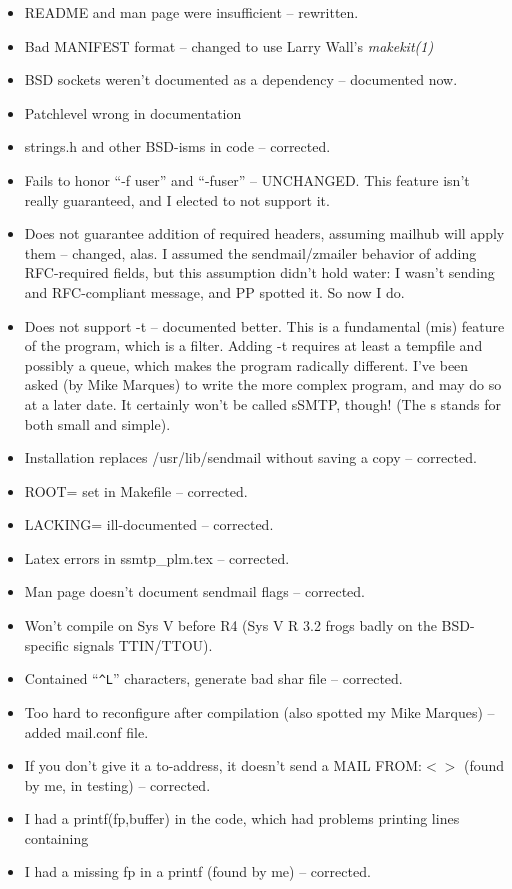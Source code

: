 \begin{itemize}
\item README and man page were insufficient -- rewritten.
\item Bad MANIFEST format -- changed to use Larry Wall's {\it makekit(1)}
\item BSD sockets weren't documented as a dependency -- documented now.
\item Patchlevel wrong in documentation
\item strings.h and other BSD-isms in code -- corrected.
\item Fails to honor ``-f user'' and ``-fuser'' -- UNCHANGED.  
	This feature isn't really guaranteed, and I elected to not
	support it.
\item Does not guarantee addition of required headers, assuming
	mailhub will apply them -- changed, alas.  I assumed the
	sendmail/zmailer behavior of adding RFC-required fields,
	but this assumption didn't hold water: I wasn't sending
	and RFC-compliant message, and PP spotted it.  So now
	I do.
\item Does not support -t -- documented better.  This is a
	fundamental (mis) feature of the program, which is a filter.
	Adding -t requires at least a tempfile and possibly a
	queue, which makes the program radically different.  I've
	been asked (by Mike Marques) to write the more complex program,
	and may do so at a later date.  It certainly won't be called
	sSMTP, though! (The s stands for both small and simple).
\item Installation replaces /usr/lib/sendmail without saving a copy -- corrected.
\item ROOT= set in Makefile -- corrected.
\item LACKING= ill-documented -- corrected.
\item Latex errors in ssmtp\_plm.tex -- corrected.
\item Man page doesn't document sendmail flags -- corrected.
\item Won't compile on Sys V before R4 (Sys V R 3.2 frogs badly on the 
	BSD-specific  signals TTIN/TTOU).
\item Contained ``\verb+^L+'' characters, generate bad shar file -- corrected.
\item Too hard to reconfigure after compilation (also spotted
	my Mike Marques) -- added mail.conf file.
\item If you don't give it a to-address, it doesn't send a MAIL FROM:$<>$
	(found by me, in testing) -- corrected.
\item I had a printf(fp,buffer) in the code, which had problems
	printing lines containing %
\item I had a missing fp in a printf (found by me) -- corrected.

\end{itemize}


